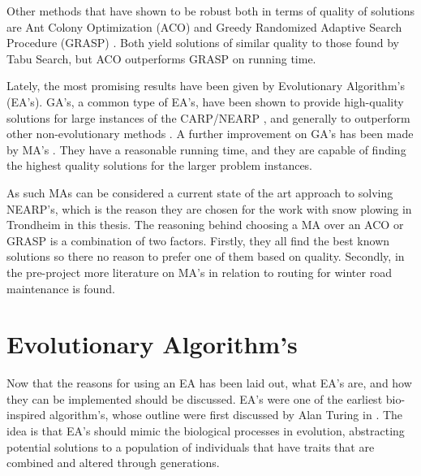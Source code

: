 Other methods that have shown to be robust both in terms of quality of solutions are Ant Colony Optimization (ACO) \citep{santos2010ACO} and Greedy Randomized Adaptive Search Procedure (GRASP) \citep{usberti2013grasp}. Both yield solutions of similar quality to those found by Tabu Search, but ACO outperforms GRASP on running time.

Lately, the most promising results have been given by Evolutionary Algorithm's (EA's). GA's, a common type of EA's, have been shown to provide high-quality solutions for large instances of the CARP/NEARP \citep{lacomme2001GA}, and generally to outperform other non-evolutionary methods \citep{wohlk2008decade}. A further improvement on GA's has been made by MA's \citep{prins2005memeticNEARP}. They have a reasonable running time, and they are capable of finding the highest quality solutions for the larger problem instances.

As such MAs can be considered a current state of the art approach to solving NEARP's, which is the reason they are chosen for the work with snow plowing in Trondheim in this thesis. The reasoning behind choosing a MA over an ACO or GRASP is a combination of two factors. Firstly, they all find the best known solutions so there no reason to prefer one of them based on quality. Secondly, in the pre-project \citep{forprosjektet} more literature on MA's in relation to routing for winter road maintenance is found.



\section{Evolutionary Algorithm's} %
\label{sec:evolutionary_algorithms}
Now that the reasons for using an EA has been laid out, what EA's are, and how they can be implemented should be discussed. EA's were one of the earliest bio-inspired algorithm's, whose outline were first discussed by Alan Turing in \citet{turing1950computing}. The idea is that EA's should mimic the biological processes in evolution, abstracting potential solutions to a population of individuals that have traits that are combined and altered through generations.


